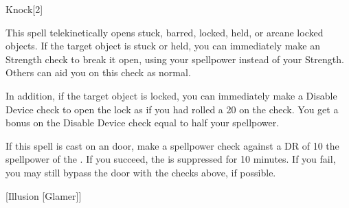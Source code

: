 \begin{spellsection}{Knock}[2]
    \begin{spellheader}
    \end{spellheader}
    \begin{spellcontent}
        \begin{spelltargetinginfo}
        \end{spelltargetinginfo}
        \begin{spelleffects}
            \spelleffect This spell telekinetically opens stuck, barred, locked, held, or arcane locked objects. If the target object is stuck or held, you can immediately make an Strength check to break it open, using your spellpower instead of your Strength. Others can aid you on this check as normal.

            In addition, if the target object is locked, you can immediately make a Disable Device check to open the lock as if you had rolled a 20 on the check. You get a bonus on the Disable Device check equal to half your spellpower.
        \end{spelleffects}
    \end{spellcontent}
    \begin{spellfooter}
        \spellnotes If this spell is cast on an  door, make a spellpower check against a DR of 10 \add the spellpower of the . If you succeed, the  is suppressed for 10 minutes. If you fail, you may still bypass the door with the checks above, if possible.
        \miscastrandom
    \end{spellfooter}
    \begin{spellaugments}
        [Illusion [Glamer]]
    \end{spellaugments}
\end{spellsection}

